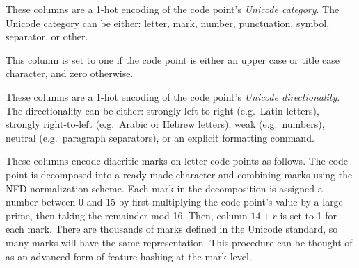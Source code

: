 \documentclass[sigconf,anonymous,review,10pt]{acmart}
\newcommand{\str}[1]{\texttt{#1}}
\newcommand{\defn}[1]{\textit{#1}}
\begin{document}
\begin{description}
\begin{description}[font=\normalfont\itshape]
\item[Columns 1-7:]
    These columns are a 1-hot encoding of the code point's \defn{Unicode category}.
    The Unicode category can be either:
%
letter,
mark,
number,
punctuation,
symbol,
separator,
or other.

\item[Column 8:]
This column is set to one if the code point is either an upper case or title case character,
and zero otherwise.

\item[Columns 9-13:]
    These columns are a 1-hot encoding of the code point's \defn{Unicode directionality}.
    The directionality can be either:
strongly left-to-right (e.g.\ Latin letters),
strongly right-to-left (e.g.\ Arabic or Hebrew letters),
weak (e.g.\ numbers),
neutral (e.g.\ paragraph separators),
or an explicit formatting command.

\item[Columns 14-29:]
These columns encode diacritic marks on letter code points as follows.
The code point is decomposed into a ready-made character and combining marks using the NFD normalization scheme.
Each mark in the decomposition is assigned a number between 0 and 15 by first multiplying the code point's value by a large prime, 
then taking the remainder mod 16.
Then, column $14+r$ is set to 1 for each mark.
There are thousands of marks defined in the Unicode standard,
so many marks will have the same representation.
This procedure can be thought of as an advanced form of feature hashing \citep{weinberger2009feature} at the mark level.


\end{description}
\end{description}
\end{document}
